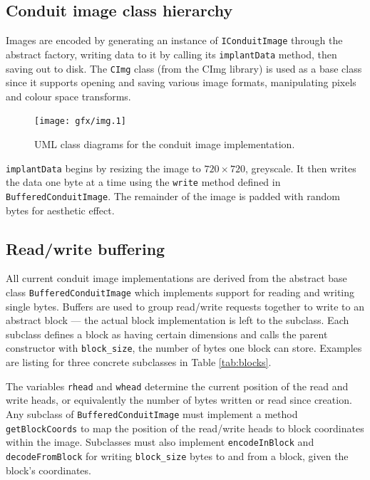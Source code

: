 \FloatBarrier
\subsection{Conduit image class hierarchy}

Images are encoded by generating an instance of {\tt IConduitImage} through the abstract factory, writing data to it by calling its {\tt implantData} method, then saving out to disk. The {\tt CImg} class (from the CImg library) is used as a base class since it supports opening and saving various image formats, manipulating pixels and colour space transforms.

    \begin{figure}[tbp]
        \begin{center}
                \texttt{[image: gfx/img.1]}
            \caption{UML class diagrams for the conduit image implementation.}
            \label{uml:img-classes}
        \end{center}
    \end{figure}
    
{\tt implantData} begins by resizing the image to $720 \times 720$, greyscale. It then writes the data one byte at a time using the {\tt write} method defined in {\tt BufferedConduitImage}. The remainder of the image is padded with random bytes for aesthetic effect.

\FloatBarrier
\subsection{Read/write buffering}

All current conduit image implementations are derived from the abstract base class {\tt BufferedConduitImage} which implements support for reading and writing single bytes. Buffers are used to group read/write requests together to write to an abstract block --- the actual block implementation is left to the subclass. Each subclass defines a block as having certain dimensions and calls the parent constructor with {\tt block\_size}, the number of bytes one block can store. Examples are listing for three concrete subclasses in Table \ref{tab:blocks}.

The variables {\tt rhead} and {\tt whead} determine the current position of the read and write heads, or equivalently the number of bytes written or read since creation. Any subclass of {\tt BufferedConduitImage} must implement a method {\tt getBlockCoords} to map the position of the read/write heads to block coordinates within the image. Subclasses must also implement {\tt encodeInBlock} and {\tt decodeFromBlock} for writing {\tt block\_size} bytes to and from a block, given the block's coordinates.


